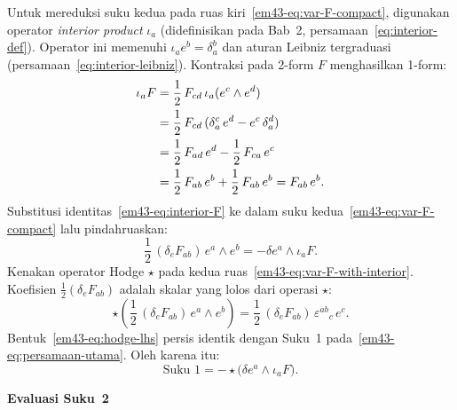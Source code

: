 Untuk mereduksi suku kedua pada ruas kiri~\eqref{em43-eq:var-F-compact}, digunakan operator \textit{interior product} $\iota_{a}$ (didefinisikan pada Bab~2, persamaan~\eqref{eq:interior-def}). Operator ini memenuhi $\iota_{a} e^{b} = \delta_{a}^{b}$ dan aturan Leibniz tergraduasi (persamaan~\eqref{eq:interior-leibniz}). Kontraksi pada 2-form $F$ menghasilkan 1-form:
\begin{align}
    \iota_{a} F
    &= \frac{1}{2}\, F_{cd}\, \iota_{a}(e^{c} \wedge e^{d}) \notag \\
    &= \frac{1}{2}\, F_{cd}\, (\delta_{a}^{c}\, e^{d} - e^{c}\, \delta_{a}^{d}) \notag \\
    &= \frac{1}{2}\, F_{ad}\, e^{d} - \frac{1}{2}\, F_{ca}\, e^{c} \notag \\
    &= \frac{1}{2}\, F_{ab}\, e^{b} + \frac{1}{2}\, F_{ab}\, e^{b} = F_{ab}\, e^{b}. \label{em43-eq:interior-F}
\end{align}
Substitusi identitas~\eqref{em43-eq:interior-F} ke dalam suku kedua~\eqref{em43-eq:var-F-compact} lalu pindahruaskan:
\begin{equation}\label{em43-eq:var-F-with-interior}
    \frac{1}{2}\, (\delta_{e} F_{ab})\, e^{a} \wedge e^{b} = -\delta e^{a} \wedge \iota_{a} F.
\end{equation}
Kenakan operator Hodge $\star$ pada kedua ruas~\eqref{em43-eq:var-F-with-interior}. Koefisien $\frac{1}{2}(\delta_{e} F_{ab})$ adalah skalar yang lolos dari operasi $\star$:
\begin{equation}\label{em43-eq:hodge-lhs}
    \star\!\left(\frac{1}{2}\, (\delta_{e} F_{ab})\, e^{a} \wedge e^{b}\right)
    = \frac{1}{2}\, (\delta_{e} F_{ab})\, \varepsilon^{ab}{}_{c}\, e^{c}.
\end{equation}
Bentuk~\eqref{em43-eq:hodge-lhs} persis identik dengan Suku~1 pada~\eqref{em43-eq:persamaan-utama}. Oleh karena itu:
\begin{equation}\label{em43-eq:suku1-final}
    \text{Suku 1} = -\star\!\big(\delta e^{a} \wedge \iota_{a} F\big).
\end{equation}

\vspace{0.5em}
\noindent \textbf{Evaluasi Suku~2}


